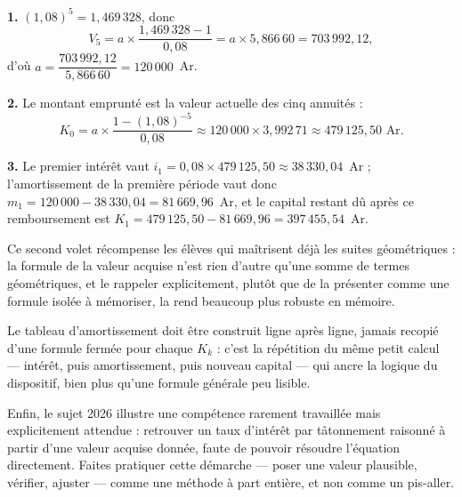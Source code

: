 \begin{corrige}
\textbf{1.} $(1{,}08)^{5} = 1{,}469\,328$, donc
\[
  V_{5} = a \times \frac{1{,}469\,328-1}{0{,}08}
  = a \times 5{,}866\,60 = 703\,992{,}12,
\]
d'où $a = \dfrac{703\,992{,}12}{5{,}866\,60} = 120\,000$~Ar.

\textbf{2.} Le montant emprunté est la valeur actuelle des cinq annuités :
\[
  K_{0} = a \times \frac{1-(1{,}08)^{-5}}{0{,}08}
  \approx 120\,000 \times 3{,}992\,71 \approx 479\,125{,}50 \text{ Ar}.
\]

\textbf{3.} Le premier intérêt vaut $i_{1} = 0{,}08 \times 479\,125{,}50
\approx 38\,330{,}04$~Ar ; l'amortissement de la première période vaut donc
$m_{1} = 120\,000-38\,330{,}04 = 81\,669{,}96$~Ar, et le capital restant dû
après ce remboursement est
$K_{1} = 479\,125{,}50-81\,669{,}96 = 397\,455{,}54$~Ar.
\end{corrige}

\begin{notepourlaclasse}
Ce second volet récompense les élèves qui maîtrisent déjà les suites
géométriques : la formule de la valeur acquise n'est rien d'autre qu'une
somme de termes géométriques, et le rappeler explicitement, plutôt que de la
présenter comme une formule isolée à mémoriser, la rend beaucoup plus
robuste en mémoire.

Le tableau d'amortissement doit être construit ligne après ligne, jamais
recopié d'une formule fermée pour chaque $K_{k}$ : c'est la répétition du
même petit calcul — intérêt, puis amortissement, puis nouveau capital — qui
ancre la logique du dispositif, bien plus qu'une formule générale peu
lisible.

Enfin, le sujet 2026 illustre une compétence rarement travaillée mais
explicitement attendue : retrouver un taux d'intérêt par tâtonnement
raisonné à partir d'une valeur acquise donnée, faute de pouvoir résoudre
l'équation directement. Faites pratiquer cette démarche — poser une valeur
plausible, vérifier, ajuster — comme une méthode à part entière, et non
comme un pis-aller.
\end{notepourlaclasse}
